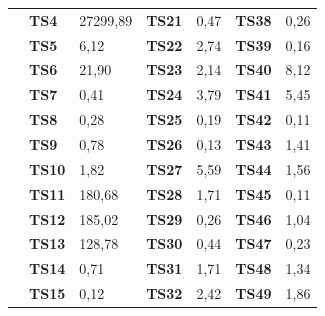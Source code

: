 \begin{table}[h]
{\begin{tabular}{|l|l|l|l|l|l|l|}
		& \textbf{TS4}       & \cellcolor[HTML]{C0C0C0}27299,89 & \textbf{TS21}      & 0,47                          & \textbf{TS38}      & 0,26                           \\ \cline{2-7} 
		& \textbf{TS5}       & 6,12                             & \textbf{TS22}      & 2,74                          & \textbf{TS39}      & 0,16                           \\ \cline{2-7} 
		& \textbf{TS6}       & 21,90                            & \textbf{TS23}      & 2,14                          & \textbf{TS40}      & 8,12                           \\ \cline{2-7} 
		& \textbf{TS7}       & 0,41                             & \textbf{TS24}      & 3,79                          & \textbf{TS41}      & 5,45                           \\ \cline{2-7} 
		& \textbf{TS8}       & 0,28                             & \textbf{TS25}      & 0,19                          & \textbf{TS42}      & 0,11                           \\ \cline{2-7} 
		& \textbf{TS9}       & 0,78                             & \textbf{TS26}      & 0,13                          & \textbf{TS43}      & 1,41                           \\ \cline{2-7} 
		& \textbf{TS10}      & 1,82                             & \textbf{TS27}      & 5,59                          & \textbf{TS44}      & 1,56                           \\ \cline{2-7} 
		& \textbf{TS11}      & \cellcolor[HTML]{C0C0C0}180,68   & \textbf{TS28}      & 1,71                          & \textbf{TS45}      & 0,11                           \\ \cline{2-7} 
		& \textbf{TS12}      & \cellcolor[HTML]{C0C0C0}185,02   & \textbf{TS29}      & 0,26                          & \textbf{TS46}      & 1,04                           \\ \cline{2-7} 
		& \textbf{TS13}      & \cellcolor[HTML]{C0C0C0}128,78   & \textbf{TS30}      & 0,44                          & \textbf{TS47}      & 0,23                           \\ \cline{2-7} 
		& \textbf{TS14}      & 0,71                             & \textbf{TS31}      & 1,71                          & \textbf{TS48}      & 1,34                           \\ \cline{2-7} 
		& \textbf{TS15}      & 0,12                             & \textbf{TS32}      & 2,42                          & \textbf{TS49}      & 1,86                           \\ \cline{2-7} 

\end{tabular}}
\end{table}
